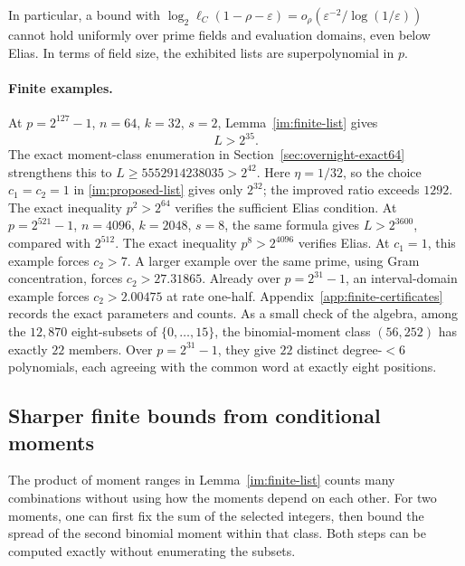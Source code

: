 \documentclass[11pt,letterpaper]{article}
\theoremstyle{definition}
\theoremstyle{remark}
\begin{document}


In particular, a bound with
$\log_2\ell_C(1-\rho-\varepsilon)
=o_\rho(\varepsilon^{-2}/\log(1/\varepsilon))$
cannot hold uniformly over prime fields and evaluation domains,
even below Elias. In terms of field size, the exhibited lists are
superpolynomial in $p$.



\paragraph{Finite examples.}
At $p=2^{127}-1$, $n=64$, $k=32$, $s=2$, Lemma~\ref{im:finite-list} gives
\[
 L>2^{35}.
\]
The exact moment-class enumeration in Section~\ref{sec:overnight-exact64}
strengthens this to $L\ge5552914238035>2^{42}$. Here $\eta=1/32$,
so the choice $c_1=c_2=1$ in \eqref{im:proposed-list} gives only $2^{32}$;
the improved ratio exceeds $1292$.
The exact inequality $p^2>2^{64}$ verifies the sufficient Elias condition.
At $p=2^{521}-1$, $n=4096$, $k=2048$, $s=8$, the same formula gives
$L>2^{3600}$, compared with $2^{512}$. The exact inequality
$p^8>2^{4096}$ verifies Elias. At $c_1=1$, this example forces $c_2>7$.
A larger example over the same prime, using Gram concentration, forces
$c_2>27.31865$. Already over $p=2^{31}-1$, an interval-domain
example forces $c_2>2.00475$ at rate one-half.
Appendix~\ref{app:finite-certificates} records the exact parameters and counts.
As a small check of the algebra, among the $12{,}870$ eight-subsets of
$\{0,\ldots,15\}$, the binomial-moment class $(56,252)$ has exactly $22$
members. Over $p=2^{31}-1$, they give $22$ distinct degree-$<6$ polynomials,
each agreeing with the common word at exactly eight positions.

\subsection{Sharper finite bounds from conditional moments}
\label{sec:conditional-moments}

The product of moment ranges in Lemma~\ref{im:finite-list} counts
many combinations without using how the moments depend on each other.
For two moments, one can first fix the sum of the selected integers,
then bound the spread of the second binomial moment within that class.
Both steps can be computed exactly without enumerating the subsets.
\end{document}
